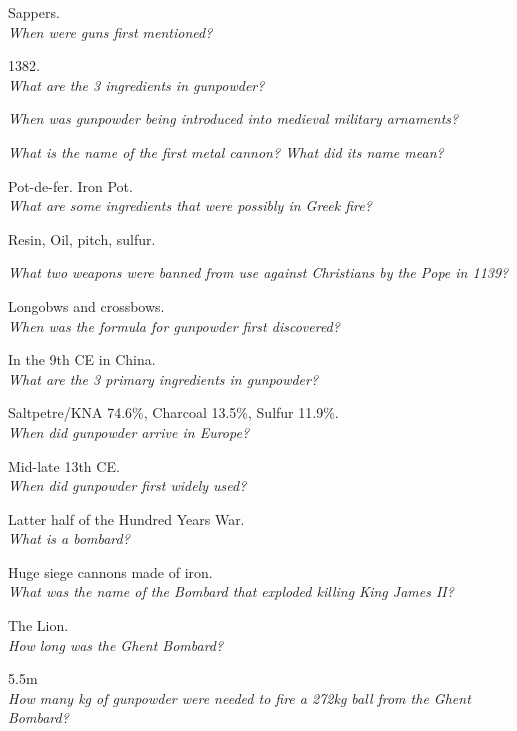 \documentclass[12pt]{article}
\begin{document}
Sappers.\\

\textit{When were guns first mentioned?}

1382.\\

\textit{What are the 3 ingredients in gunpowder?}

\textit{When was gunpowder being introduced into medieval military arnaments?}

\textit{What is the name of the first metal cannon? What did its name mean?}

Pot-de-fer. Iron Pot.\\

\textit{What are some ingredients that were possibly in Greek fire?}

Resin, Oil, pitch, sulfur.

\textit{What two weapons were banned from use against Christians by the Pope in 1139?}

Longobws and crossbows.\\

\textit{When was the formula for gunpowder first discovered?}

In the 9th CE in China.\\

\textit{What are the 3 primary ingredients in gunpowder?}

Saltpetre/KNA 74.6\%, Charcoal 13.5\%, Sulfur 11.9\%.\\

\textit{When did gunpowder arrive in Europe?}

Mid-late 13th CE.\\

\textit{When did gunpowder first widely used?}

Latter half of the Hundred Years War.\\

\textit{What is a bombard?}

Huge siege cannons made of iron.\\

\textit{What was the name of the Bombard that exploded killing King James II?}

The Lion.\\

\textit{How long was the Ghent Bombard?}

5.5m\\

\textit{How many kg of gunpowder were needed to fire a 272kg ball from the Ghent Bombard?}
\end{document}
